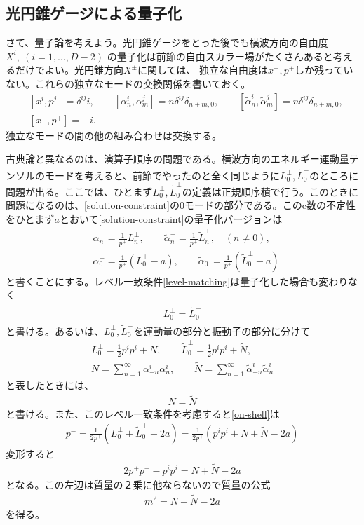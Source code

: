 \documentclass[report,paper=a4, fontsize=12pt, line_length=16cm, number_of_lines=33,dvipdfmx]{jlreq}
\numberwithin{equation}{chapter}
\numberwithin{equation}{section}
\newcommand{\alphat}{\tilde{\alpha}}
\newcommand{\Nt}{\widetilde{N}}
\newcommand{\Lp}{L^{\perp}}
\newcommand{\Ltp}{\widetilde{L}^{\perp}}
\begin{document}
\subsection{光円錐ゲージによる量子化}
さて、量子論を考えよう。光円錐ゲージをとった後でも横波方向の自由度$X^{i},\ (i=1,\dots, D-2)$
の量子化は前節の自由スカラー場がたくさんあると考えるだけでよい。光円錐方向$X^{\pm}$に関しては、
独立な自由度は$x^{-},p^{+}$しか残っていない。これらの独立なモードの交換関係を書いておく。
\begin{align}
&[x^{i},p^{j}]=\delta^{ij}i,\qquad
[\alpha_n^{i},\alpha_m^{j}]=n\delta^{ij}\delta_{n+m,0},\qquad
[\alphat_n^{i},\alphat_m^{j}]=n\delta^{ij}\delta_{n+m,0},\\
&[x^{-},p^{+}]=-i.
\end{align}
独立なモードの間の他の組み合わせは交換する。

古典論と異なるのは、演算子順序の問題である。横波方向のエネルギー運動量テンソルのモードを考えると、前節でやったのと全く同じように$\Lp_0,\Ltp_0$のところに問題が出る。ここでは、ひとまず$\Lp_0,\Ltp_0$の定義は正規順序積で行う。このときに問題になるのは、\eqref{solution-constraint}の0モードの部分である。このc数の不定性をひとまず$a$とおいて\eqref{solution-constraint}の量子化バージョンは
\begin{align}
&
\alpha_n^{-}=\frac{1}{p^{+}}\Lp_n,\qquad
\alphat_n^{-}=\frac{1}{p^{+}}\Ltp_n,\quad (n\ne 0),\\
&
\alpha_0^{-}=\frac{1}{p^{+}}(\Lp_0-a),\qquad
\alphat_0^{-}=\frac{1}{p^{+}}(\Ltp_0-a)\label{on-shell}
\end{align}
と書くことにする。レベル一致条件\eqref{level-matching}は量子化した場合も変わりなく
\begin{align}
\Lp_0=\Ltp_0
\end{align}
と書ける。あるいは、$\Lp_0,\Ltp_0$を運動量の部分と振動子の部分に分けて
\begin{align}
\Lp_0=\frac12 p^ip^i+N,\qquad
\Ltp_0=\frac12 p^ip^i+\Nt,\\
N=\sum_{n=1}^\infty\alpha^{i}_{-n}\alpha^{i}_{n},\qquad
\Nt=\sum_{n=1}^\infty\alphat^{i}_{-n}\alphat^{i}_{n}
\end{align}
と表したときには、
\begin{align}
N=\Nt
\label{level-matching2}
\end{align}
と書ける。また、このレベル一致条件を考慮すると\eqref{on-shell}は
\begin{align}
p^{-}=\frac{1}{2p^{+}}(\Lp_0+\Ltp_0-2a)
=\frac{1}{2p^{+}}(p^ip^i+N+\Nt-2a)
\end{align}
変形すると
\begin{align}
2p^{+}p^{-}-p^i p^i=N+\Nt-2a
\end{align}
となる。この左辺は質量の２乗に他ならないので質量の公式
\begin{align}
m^2=N+\Nt-2a
\label{mass-formula}
\end{align}
を得る。
\end{document}
